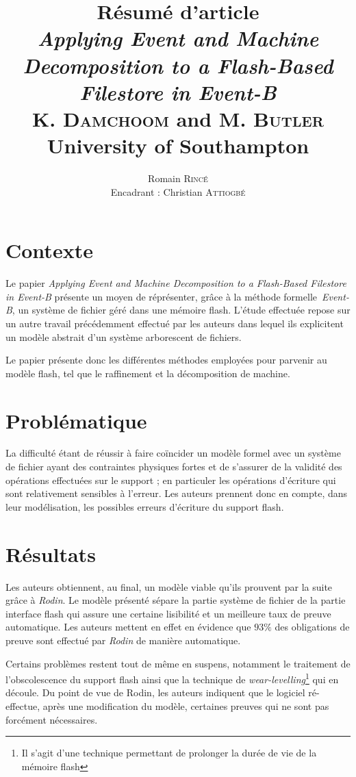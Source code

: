 \documentclass[12pt,a4paper,utf8x]{article}
\title{{\large \textbf{Résumé d'article}\\\emph{Applying Event and Machine Decomposition to a Flash-Based Filestore in Event-B}\\\vspace{0.2cm}
 {\scriptsize K. \textsc{Damchoom} and M. \textsc{Butler}\\\vspace{-0.5cm}University of Southampton}}}
\author{\small Romain \textsc{Rincé}\\{\small Encadrant : Christian \textsc{Attiogbé}}}
\date{}
\begin{document}
\maketitle
\renewcommand{\labelitemi}{$\bullet$} 


\section{Contexte}
Le papier \emph{Applying Event and Machine Decomposition to a Flash-Based Filestore in Event-B} présente un moyen de réprésenter, grâce à la méthode formelle~\emph{Event-B}, un système de fichier géré dans une mémoire flash. L'étude effectuée repose sur un autre travail précédemment effectué par les auteurs dans lequel ils explicitent un modèle abstrait d'un système arborescent de fichiers.

Le papier présente donc les différentes méthodes employées pour parvenir au modèle flash, tel que le raffinement et la décomposition de machine.

\section{Problématique}
La difficulté étant de réussir à faire coïncider un modèle formel avec un système de fichier ayant des contraintes physiques fortes et de s'assurer de la validité des opérations effectuées sur le support ; en particuler les opérations d'écriture qui sont relativement sensibles à l'erreur. Les auteurs prennent donc en compte, dans leur modélisation, les possibles erreurs d'écriture du support flash.

\section{Résultats}
Les auteurs obtiennent, au final, un modèle viable qu'ils prouvent par la suite grâce à \emph{Rodin}. Le modèle présenté sépare la partie \og système de fichier\fg{} de la partie \og interface flash\fg{} qui assure une certaine lisibilité et un meilleure taux de preuve automatique. Les auteurs mettent en effet en évidence que $93 \%$ des obligations de preuve sont effectué par \emph{Rodin} de manière automatique.

Certains problèmes restent tout de même en suspens, notamment le traitement de l'obscolescence du support flash ainsi que la technique de \emph{wear-levelling}\footnote{Il s'agit d'une technique permettant de prolonger la durée de vie de la mémoire flash} qui en découle. Du point de vue de Rodin, les auteurs indiquent que le logiciel ré-effectue, après une modification du modèle, certaines preuves qui ne sont pas forcément nécessaires.
\end{document}
